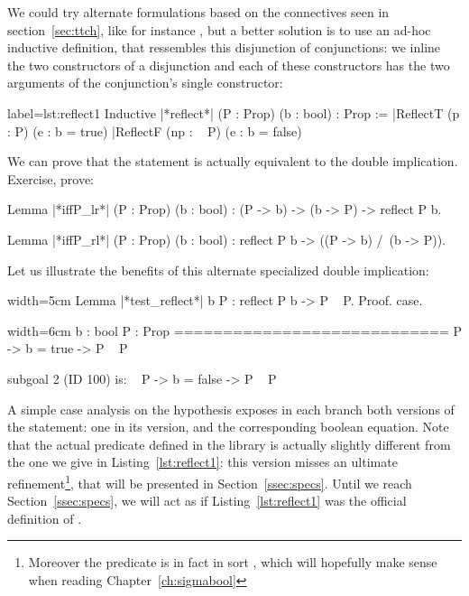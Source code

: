 We could try
alternate formulations based on the connectives seen in
section~\ref{sec:ttch}, like for instance
, but a better solution is
to use an ad-hoc inductive definition, that ressembles this
disjunction of conjunctions: we inline the two constructors of a
disjunction and each of these constructors has the two arguments of
the conjunction's single constructor:

\begin{coq}{}{label=lst:reflect1}
Inductive |*reflect*| (P : Prop) (b : bool) : Prop :=
|ReflectT (p : P)    (e : b = true)
|ReflectF (np : ~ P) (e : b = false)
\end{coq}

We can prove that the statement  is actually equivalent
to the double implication. Exercise, prove:

\begin{coq}{}{}
Lemma |*iffP_lr*| (P : Prop) (b : bool) : (P -> b) -> (b -> P) -> reflect P b.

Lemma |*iffP_rl*| (P : Prop) (b : bool) : reflect P b -> ((P -> b) /\ (b -> P)).
\end{coq}

Let us illustrate the benefits of this alternate specialized double
implication:

\begin{coq}{}{width=5cm}
Lemma |*test_reflect*| b P :
  reflect P b -> P \/ ~ P.
Proof.
case.
\end{coq}
\begin{coqout}{}{width=6cm}
  b : bool
  P : Prop
  ============================
   P -> b = true -> P \/ ~ P

subgoal 2 (ID 100) is:
 ~ P -> b = false -> P \/ ~ P
\end{coqout}

A simple case analysis on the hypothesis  exposes in
each branch both versions of the statement: one in its 
version, and the corresponding boolean equation. Note that the actual
 predicate defined in the  library is actually
slightly different from the one we give in Listing~\ref{lst:reflect1}:
this version misses an ultimate refinement\footnote{Moreover the 
predicate is in fact in sort , which will hopefully make sense
when reading Chapter~\ref{ch:sigmabool}}, that will be presented in
Section~\ref{ssec:specs}. Until we reach Section~\ref{ssec:specs}, we
will act as if Listing~\ref{lst:reflect1} was the official definition
of .

